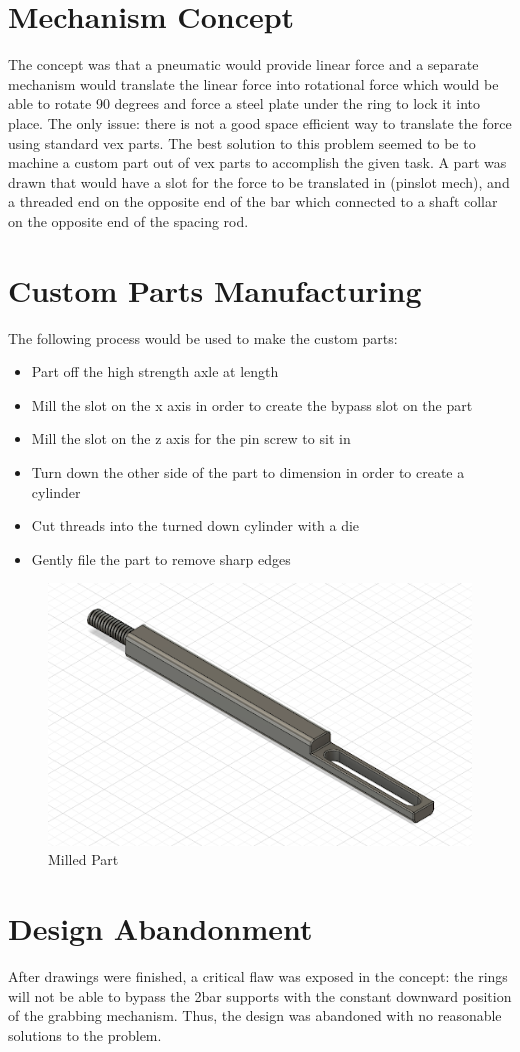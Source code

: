 \section*{Mechanism Concept}
The concept was that a pneumatic would provide linear force and a separate mechanism would translate the linear force into rotational force which would be able to rotate 90 degrees and force a steel plate under the ring to lock it into place. The only issue: there is not a good space efficient way to translate the force using standard vex parts. The best solution to this problem seemed to be to machine a custom part out of vex parts to accomplish the given task. A part was drawn that would have a slot for the force to be translated in (pinslot mech), and a threaded end on the opposite end of the bar which connected to a shaft collar on the opposite end of the spacing rod.

\section*{Custom Parts Manufacturing}
The following process would be used to make the custom parts:
\begin{itemize}
\item Part off the high strength axle at length
\item Mill the slot on the x axis in order to create the bypass slot on the part
\item Mill the slot on the z axis for the pin screw to sit in
\item Turn down the other side of the part to dimension in order to create a cylinder
\item Cut threads into the turned down cylinder with a die
\item Gently file the part to remove sharp edges
\end{itemize}
 \begin{figure}[h!]
     \centering
     \includegraphics[width=0.5\linewidth]{images/Milled Part.png}
     \caption{Milled Part}
     \label{fig:milled-part}
 \end{figure}
\section*{Design Abandonment}
After drawings were finished, a critical flaw was exposed in the concept: the rings will not be able to bypass the 2bar supports with the constant downward position of the grabbing mechanism. Thus, the design was abandoned with no reasonable solutions to the problem.
\label{Second-Bot-Idea}
